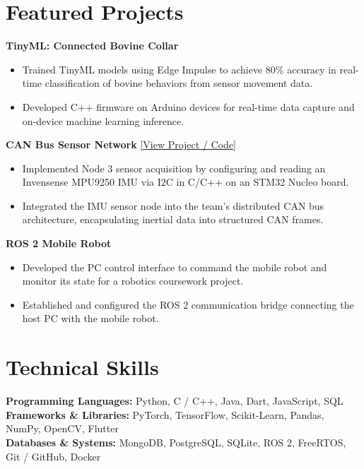 \documentclass[10pt,a4paper]{article}
\begin{document}
\section{Featured Projects}
\noindent
\textbf{\color{primary} TinyML: Connected Bovine Collar}
\begin{itemize}
    \item \small Trained TinyML models using Edge Impulse to achieve 80\% accuracy in real-time classification of bovine behaviors from sensor movement data.
    \item \small Developed C++ firmware on Arduino devices for real-time data capture and on-device machine learning inference.
\end{itemize}
\noindent
\textbf{\color{primary} CAN Bus Sensor Network}
\hfill {\footnotesize\href{https://lnkd.in/es9Zi695}{[View Project / Code]}}
\begin{itemize}
    \item \small Implemented Node 3 sensor acquisition by configuring and reading an Invensense MPU9250 IMU via I2C in C/C++ on an STM32 Nucleo board.
    \item \small Integrated the IMU sensor node into the team's distributed CAN bus architecture, encapsulating inertial data into structured CAN frames.
\end{itemize}
\noindent
\textbf{\color{primary} ROS 2 Mobile Robot}
\begin{itemize}
    \item \small Developed the PC control interface to command the mobile robot and monitor its state for a robotics coursework project.
    \item \small Established and configured the ROS 2 communication bridge connecting the host PC with the mobile robot.
\end{itemize}

\section{Technical Skills}
\small
\noindent\textbf{Programming Languages:} Python, C / C++, Java, Dart, JavaScript, SQL\\[1.5pt]
\noindent\textbf{Frameworks \& Libraries:} PyTorch, TensorFlow, Scikit-Learn, Pandas, NumPy, OpenCV, Flutter\\[1.5pt]
\noindent\textbf{Databases \& Systems:} MongoDB, PostgreSQL, SQLite, ROS 2, FreeRTOS, Git / GitHub, Docker\\[1.5pt]
\end{document}
